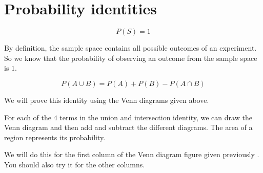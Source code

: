 \section{Probability identities}
\begin{equation*}
 P(S)=1
\end{equation*}


By definition, the sample space contains all possible outcomes of an
experiment. So we know that the probability of observing an outcome
from the sample space is $1$.

\begin{equation*}
 P(A \cup B) = P(A) + P(B) - P(A \cap B)
\end{equation*}


We will prove this identity using the Venn diagrams given above.

For each of the $4$ terms in the
union and intersection identity, we can draw the Venn diagram and then
add and subtract the different diagrams. The area of a region
represents its probability.

We will do this for the first column of the Venn diagram figure given previously%
. You should also try it for the
other columns.

